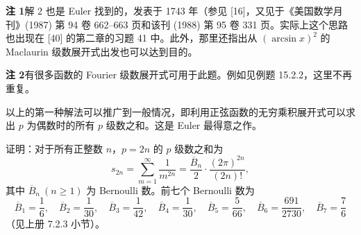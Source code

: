 \begin{xremark}
\textbf{注 1}\quad 解 2 也是 Euler 找到的，发表于 1743 年（参见 [16]，又见于《美国数学月刊》(1987) 第 94 卷 662--663 页和该刊 (1988) 第 95 卷 331 页。实际上这个思路也出现在 [40] 的第二章的习题 41 中。此外，那里还指出从 $(\arcsin x)^2$ 的 Maclaurin 级数展开式出发也可以达到目的。

\textbf{注 2}\quad 有很多函数的 Fourier 级数展开式可用于此题。例如见例题 15.2.2，这里不再重复。
\end{xremark}

以上的第一种解法可以推广到一般情况，即利用正弦函数的无穷乘积展开式可以求出 $p$ 为偶数时的所有 $p$ 级数之和。这是 Euler 最得意之作。

\begin{xexample}[16.2.3]
证明：对于所有正整数 $n$，$p=2n$ 的 $p$ 级数之和为
\begin{equation}
  s_{2n}=\sum_{m=1}^{\infty}\frac1{m^{2n}}
  =\frac{\overline B_n}{2}\cdot\frac{(2\pi)^{2n}}{(2n)!},
\tag{16.10}
\label{eq:16.10}
\end{equation}
其中 $\overline B_n\ (n\geqslant1)$ 为 Bernoulli 数。前七个 Bernoulli 数为
\[
  \overline B_1=\frac16,\quad \overline B_2=\frac1{30},\quad
  \overline B_3=\frac1{42},\quad \overline B_4=\frac1{30},\quad
  \overline B_5=\frac5{66},\quad \overline B_6=\frac{691}{2730},\quad
  \overline B_7=\frac76
\]
（见上册 7.2.3 小节）。
\end{xexample}

